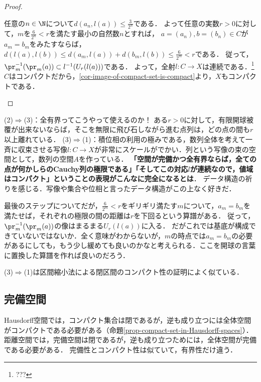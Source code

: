 \documentclass[uplatex,dvipdfmx]{jsreport}
\begin{document}
\begin{proof}
\begin{description}
\begin{description}
            任意の$n\in\N$について$d(a_n,l(a))\le\frac{3}{2^n}$である．
            よって任意の実数$r>0$に対して，$m$を$\frac{6}{2^n}<r$を満たす最小の自然数$n$とすれば，
            $a=(a_n),b=(b_n)\in C$が$a_m=b_m$をみたすならば，$d(l(a),l(b))\le d(a_m,l(a))+d(b_m,l(b))\le\frac{6}{2^m}<r$である．
            従って，$\pr^{-1}_m(\pr_m(a))\subset l^{-1}(U_r(l(a)))$である．
            よって，全射$l:C\to X$は連続である．\footnote{???}
            $C$はコンパクトだから，\ref{cor-image-of-compact-set-is-compact}より，$X$もコンパクトである．
        \end{description}
    \end{description}
\end{proof}
\begin{remarks}[データ構造の祈り]
    (2)$\Rightarrow$(3)：全有界ってこうやって使えるのか！
    ある$r>0$に対して，有限開球被覆が出来ないならば，そこを無限に飛び石しながら進む点列は，どの点の間も$r$以上離れている．
    (3)$\Rightarrow$(1)：積位相の利用の極みである，数列全体を考えて一斉に収束させる写像$l:C\to X$が非常にスケールがでかい．列という写像の束の空間として，数列の空間$A$を作っている．
    \textbf{「空間が完備かつ全有界ならば，全ての点が何かしらのCauchy列の極限である」「そしてこの対応$l$が連続なので，値域はコンパクト」ということの表現がこんなに完全になるとは}．
    データ構造の祈りを感じる．写像や集合や位相と言ったデータ構造がこの上なく好きだ．

    最後のステップについてだが，$\frac{6}{2^m}<r$をギリギリ満たす$m$について，$a_m=b_m$を満たせば，それぞれの極限の間の距離は$r$を下回るという算譜がある．
    従って，$\pr_m^{-1}(\pr_m(a))$の像はまるまる$U_r(l(a))$に入る．
    だがこれでは基底が構成できていないではないか．全く意味がわからないが，$m$の時点では$a_m=b_m$の必要があるにしても，もう少し緩めても良いのかなと考えられる．ここを開球の言葉に置換した算譜を作れば良いのだろう．
\end{remarks}
\begin{remark}
    (3)$\Rightarrow$(1)は区間縮小法による閉区間のコンパクト性の証明によく似ている．
\end{remark}

\subsection{完備空間}

\begin{tcolorbox}[colframe=ForestGreen, colback=ForestGreen!10!white, breakable ,colbacktitle=ForestGreen!40!white, coltitle=black,fonttitle=\bfseries\sffamily
    ,title=完備空間]
    Hausdorff空間では，コンパクト集合は閉であるが，逆も成り立つには全体空間がコンパクトである必要がある（命題\ref{prop-compact-set-in-Hausdorff-spaces}）．
    距離空間では，完備空間は閉であるが，逆も成り立つためには，全体空間が完備である必要がある．
    完備性とコンパクト性は似ていて，有界性だけ違う．
\end{tcolorbox}
\end{document}
